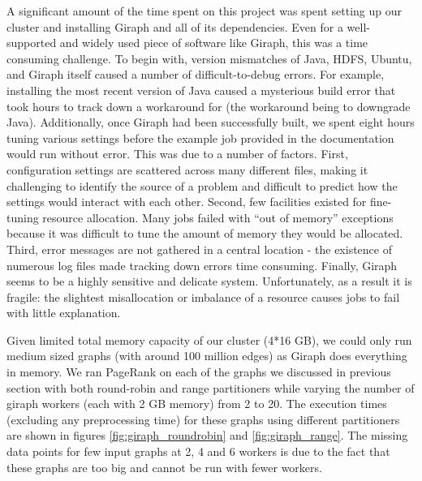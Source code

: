 A significant amount of the time spent on this project was spent setting up our cluster and installing 
Giraph and all of its dependencies. Even for a well-supported and widely used piece of software like 
Giraph, this was a time consuming challenge. To begin with, version mismatches of Java, HDFS, Ubuntu, 
and Giraph itself caused a number of difficult-to-debug errors. For example, installing the most recent 
version of Java caused a mysterious build error that took hours to track down a workaround for (the workaround 
being to downgrade Java). Additionally, once Giraph had been successfully built, we spent eight 
hours tuning various settings before the example job provided in the documentation would run without error. 
This was due to a number of factors. First, configuration settings are scattered across many different files, 
making it challenging to identify the source of a problem and difficult to predict how the settings would interact 
with each other. Second, few facilities existed for fine-tuning resource allocation. Many jobs failed with 
``out of memory'' exceptions because it was difficult to tune the amount of memory they would be 
allocated. Third, error messages are not gathered in a central location - the existence of numerous log files made 
tracking down errors time consuming. Finally, Giraph seems to be a highly sensitive and delicate system. 
Unfortunately, as a result it is fragile: the slightest misallocation or imbalance of a resource causes jobs to 
fail with little explanation.

Given limited total memory capacity of our cluster (4*16 GB), we could only run medium sized graphs 
(with around 100 million edges) as Giraph does everything in memory. We ran PageRank on each of the graphs 
we discussed in previous section with both round-robin and range partitioners while varying the number of 
giraph workers (each with 2 GB memory) from 2 to 20. The execution times (excluding any preprocessing time) 
for these graphs using different partitioners are shown in figures \ref{fig:giraph_roundrobin} and 
\ref{fig:giraph_range}. The missing data points for few input graphs at 2, 4 and 6 workers is due to the fact 
that these graphs are too big and cannot be run with fewer workers. 


